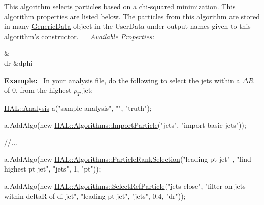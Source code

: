 This algorithm selects particles based on a chi-\/squared minimization. This algorithm properties are listed below. The particles from this algorithm are stored in many \hyperlink{class_h_a_l_1_1_generic_data}{Generic\+Data} object in the User\+Data under output names given to this algorithm's constructor.~\newline
~\newline
{\itshape Available Properties\+:} \begin{TabularC}{2}
\hline
{}\PBS{}&\PBS\centering {\bf $ \Delta\phi $  }\\
\PBS\centering dr &\PBS\centering dphi \\
\end{TabularC}
{\bfseries Example\+:}~\newline
In your analysis file, do the following to select the jets within a $ \Delta R $ of 0. from the highest $ p_T $ jet\+:


\begin{DoxyCode}
\hyperlink{class_h_a_l_1_1_analysis}{HAL::Analysis} a(\textcolor{stringliteral}{"sample analysis"}, \textcolor{stringliteral}{""}, \textcolor{stringliteral}{"truth"});

a.AddAlgo(\textcolor{keyword}{new} \hyperlink{class_h_a_l_1_1_algorithms_1_1_import_particle}{HAL::Algorithms::ImportParticle}(\textcolor{stringliteral}{"jets"}, \textcolor{stringliteral}{"import basic jets"}));

\textcolor{comment}{//...}

a.AddAlgo(\textcolor{keyword}{new} \hyperlink{class_h_a_l_1_1_algorithms_1_1_particle_rank_selection}{HAL::Algorithms::ParticleRankSelection}(\textcolor{stringliteral}{"leading pt jet"}
      , \textcolor{stringliteral}{"find highest pt jet"}, 
                                                     \textcolor{stringliteral}{"jets"},
                                                     1, \textcolor{stringliteral}{"pt"}));

a.AddAlgo(\textcolor{keyword}{new} \hyperlink{class_h_a_l_1_1_algorithms_1_1_select_ref_particle}{HAL::Algorithms::SelectRefParticle}(\textcolor{stringliteral}{"jets close"}, \textcolor{stringliteral}{"filter on
       jets within deltaR of di-jet"}, 
                                                 \textcolor{stringliteral}{"leading pt jet"}, \textcolor{stringliteral}{"jets"},
                                                 0.4, \textcolor{stringliteral}{"dr"}));
\end{DoxyCode}
 

